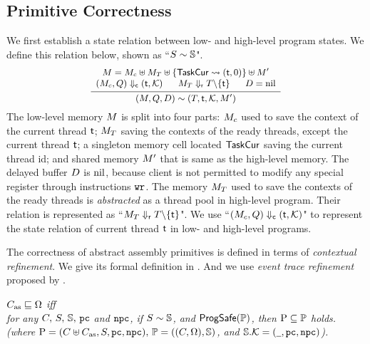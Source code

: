 % 
\subsection{Primitive Correctness}
\label{subsec:correctness-primitive}

We first establish a state relation
between low- and high-level program states.
We define this relation below, shown as
``${S} \sim {\mathbb{S}}$".
\[
    \small
    \infer
    {
        \stateRel{(\Mem, \Rstate, \DBuf)}
            {(\thrdpool, \thrdid, \hthrdlocalst, \Mem')}
    }
    {
        \begin{array}{c}
            \Mem = \Mem_c \uplus \Mem_T \uplus
                \{ \TaskCur \rightsquigarrow (\thrdid, 0) \}
                \uplus \Mem' \\
            \curStRel{(\Mem_c, \Rstate)}{(\thrdid, \hthrdlocalst)}
            \quad \ \
            \rdyStRel{\Mem_T}{\thrdpool \backslash \{ \thrdid \}}
            \quad \ \
            \DBuf = \nil
        \end{array}
    }
\]
The low-level memory $M$ is split into four parts:
$M_c$ used to save the context of the current thread $\textsf{t}$;
$M_T$ saving the contexts of the ready threads,
except the current thread $\textsf{t}$; a singleton memory
cell located $\mathsf{TaskCur}$ saving the current thread id; and shared
memory $M'$ that is same as the high-level memory.
The delayed buffer $D$ is $\text{nil}$, because client
is not permitted to modify any special register
through instructions $\texttt{wr}{}$. The memory $M_T$ used to
save the contexts of the ready threads is {\it abstracted} as a thread pool
in high-level program. Their relation is represented as
``${M_T} \Downarrow_{\textsf{r}} {T \backslash \{ \textsf{t} \}}$".
We use ``${(M_c, Q)} \Downarrow_{\textsf{c}} {(\textsf{t}, \mathcal{K})}$"
to represent the state relation of current thread $\textsf{t}$
in low- and high-level programs.

The correctness of abstract assembly primitives
is defined in terms of {\it contextual refinement}.
We give its formal definition in
\Def{\ref{def:prim-correctness}}.
And we use {\it event trace refinement}
proposed by \etal{Liang} \cite{liang14lics}.

\begin{definition}
    \em
    \label{def:prim-correctness}
    $C_{\text{as}} \sqsubseteq \Omega$ iff  \\
    for any $C, \, S, \, \mathbb{S}, \, \texttt{pc}$ and $\texttt{npc}$, if
    ${S} \sim {\mathbb{S}}$, and $\textsf{ProgSafe}(\mathbb{P})$,
    then $\text{P} \subseteq \mathbb{P}$ holds.
    (where $\text{P} = (C \uplus C_{\text{as}}, S, \texttt{pc}, \texttt{npc}), \,
        \mathbb{P} = ((C, \Omega), \mathbb{S})$, and
        $\mathbb{S}.\mathcal{K} = (\underline{\ \,}, \texttt{pc}, \texttt{npc})$).
\end{definition}

